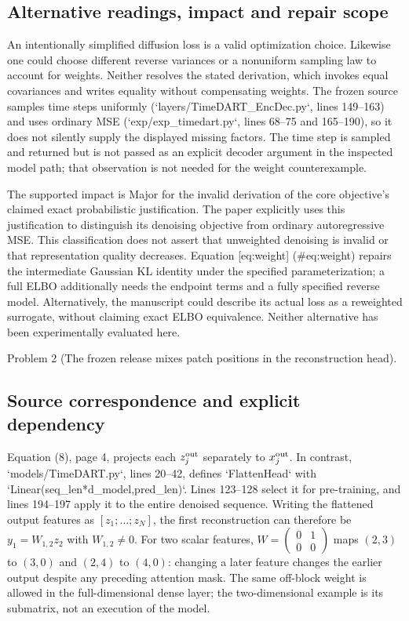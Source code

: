\documentclass[10pt]{article}
\begin{document}
\subsection*{Alternative readings, impact and repair scope}
An intentionally simplified diffusion loss is a valid optimization choice. Likewise one could choose different reverse variances or a nonuniform sampling law to account for weights. Neither resolves the stated derivation, which invokes equal covariances and writes equality without compensating weights. The frozen source samples time steps uniformly (`layers/TimeDART\_EncDec.py`, lines 149–163) and uses ordinary MSE (`exp/exp\_timedart.py`, lines 68–75 and 165–190), so it does not silently supply the displayed missing factors. The time step is sampled and returned but is not passed as an explicit decoder argument in the inspected model path; that observation is not needed for the weight counterexample.\par
The supported impact is Major for the invalid derivation of the core objective’s claimed exact probabilistic justification. The paper explicitly uses this justification to distinguish its denoising objective from ordinary autoregressive MSE. This classification does not assert that unweighted denoising is invalid or that representation quality decreases. Equation [eq:weight] (\#eq:weight) repairs the intermediate Gaussian KL identity under the specified parameterization; a full ELBO additionally needs the endpoint terms and a fully specified reverse model. Alternatively, the manuscript could describe its actual loss as a reweighted surrogate, without claiming exact ELBO equivalence. Neither alternative has been experimentally evaluated here.\par
Problem 2 (The frozen release mixes patch positions in the reconstruction head).\par
\subsection*{Source correspondence and explicit dependency}
Equation (8), page 4, projects each \(z_j^{\rm out}\) separately to \(x_j^{\rm out}\). In contrast, `models/TimeDART.py`, lines 20–42, defines `FlattenHead` with `Linear(seq\_len*d\_model,pred\_len)`. Lines 123–128 select it for pre-training, and lines 194–197 apply it to the entire denoised sequence. Writing the flattened output features as \([z_1;\ldots;z_N]\), the first reconstruction can therefore be \(y_1=W_{1,2}z_2\) with \(W_{1,2}\ne0\). For two scalar features, \(W=\left(\begin{smallmatrix}0&1\\0&0\end{smallmatrix}\right)\) maps \((2,3)\) to \((3,0)\) and \((2,4)\) to \((4,0)\): changing a later feature changes the earlier output despite any preceding attention mask. The same off-block weight is allowed in the full-dimensional dense layer; the two-dimensional example is its submatrix, not an execution of the model.\par
\end{document}
